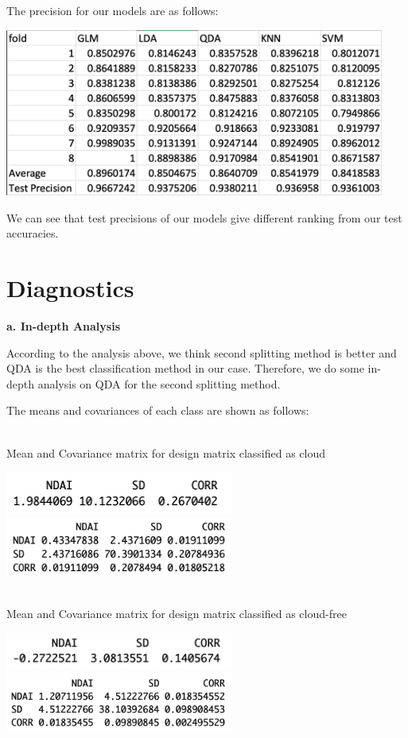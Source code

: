 \documentclass[11pt]{article}
\begin{document}
The precision for our models are as follows:

\includegraphics[width = 12.5cm]{3(c)1}

We can see that test precisions of our models give different ranking from our test accuracies.


\section{Diagnostics}

\vspace{0.2cm}
\textbf{a. In-depth Analysis}

According to the analysis above, we think second splitting method is better and QDA is the best classification method in our case. Therefore, we do some in-depth analysis on QDA for the second splitting method.

The means and covariances of each class are shown as follows:

\mbox{}\\
Mean and Covariance matrix for design matrix classified as cloud

\includegraphics[width = 7.5cm]{4(a)1}
\includegraphics[width = 7.5cm]{4(a)2}

\mbox{}\\
Mean and Covariance matrix for design matrix classified as cloud-free

\includegraphics[width = 7.5cm]{4(a)3}
\includegraphics[width = 7.5cm]{4(a)4}
\end{document}
